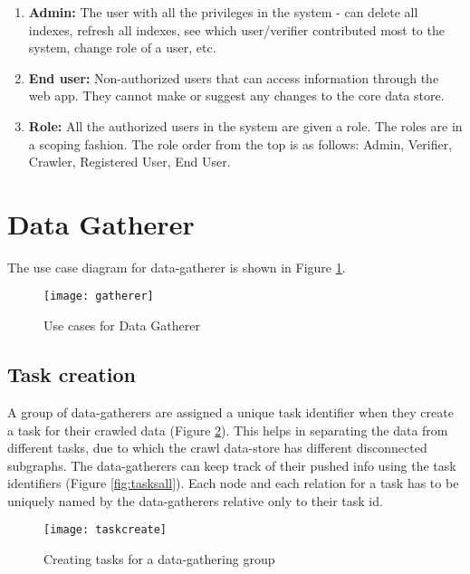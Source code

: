 \begin{enumerate}
    \item \textbf{Admin:} The user with all the privileges in the system - can delete all indexes, refresh all indexes, see which user/verifier contributed most to the system, change role of a user, etc.

    \item \textbf{End user:} Non-authorized users that can access information through the web app. They cannot make or suggest any changes to the core data store.

    \item \textbf{Role:} All the authorized users in the system are given a role. The roles are in a scoping fashion. The role order from the top is as follows: Admin, Verifier, Crawler, Registered User, End User.  

\end{enumerate}




\section{Data Gatherer}

The use case diagram for data-gatherer is shown in Figure \ref{fig:gatherer}.

\begin{figure}[H]
\begin{center}  
\texttt{[image: gatherer]} 
\caption{Use cases for Data Gatherer}
\label{fig:gatherer}
\end{center}
\end{figure}


\subsection{Task creation}
A group of data-gatherers are assigned a unique task identifier when they create a task for their crawled data (Figure \ref{fig:taskcreate}). This helps in separating the data from different tasks, due to which the crawl data-store has different disconnected subgraphs. The data-gatherers can keep track of their pushed info using the task identifiers (Figure \ref{fig:tasksall}). Each node and each relation for a task has to be uniquely named by the data-gatherers relative only to their task id.


\begin{figure}[H]
\begin{center}  
\texttt{[image: taskcreate]} 
\caption{Creating tasks for a data-gathering group}
\label{fig:taskcreate}
\end{center}
\end{figure}


